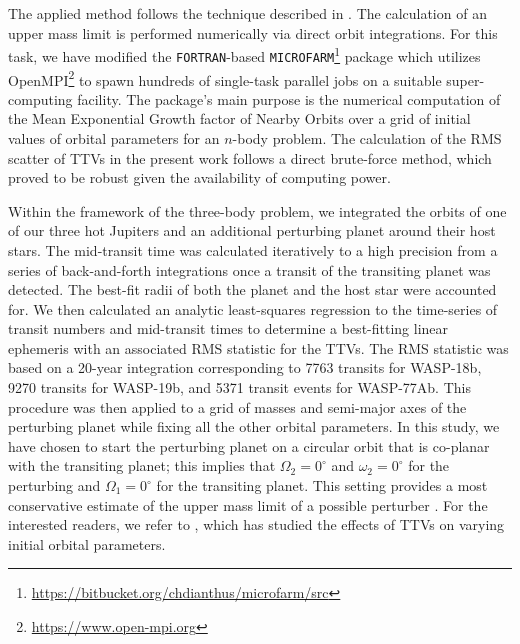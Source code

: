 The applied method follows the technique described in \citet{TEMP1,TEMP2,TEMP4}. The calculation of an upper mass limit is performed numerically via direct orbit integrations. For this task, we have modified the \texttt{FORTRAN}-based \texttt{MICROFARM}\footnote{\url{https://bitbucket.org/chdianthus/microfarm/src}}
package \citep{go2003,go2008} which utilizes OpenMPI\footnote{\url{https://www.open-mpi.org}} to spawn hundreds of single-task parallel jobs on a suitable super-computing facility. The package's main purpose is the numerical computation of the Mean Exponential Growth factor of Nearby Orbits
\citep[MEGNO]{cincsimo2000, go2001, ci2003} over a grid of initial values of orbital parameters for an $n$-body problem. The calculation of the RMS scatter of TTVs in the present work follows a direct brute-force method, which proved to be robust given the availability of computing power.

Within the framework of the three-body problem, we integrated the orbits of one of our three hot Jupiters and an additional perturbing planet around their host stars. The mid-transit time was calculated iteratively to a high precision from a series of back-and-forth integrations once a transit of the transiting planet was detected. The best-fit radii of both the planet and the host star were accounted for. We then calculated an analytic least-squares regression to the time-series of transit numbers and mid-transit times to determine a best-fitting linear ephemeris with an associated RMS statistic for the TTVs. The RMS statistic was based on a 20-year integration corresponding to 7763 transits for WASP-18b, 9270 transits for WASP-19b, and 5371 transit events for WASP-77Ab. This procedure was then applied to a grid of masses and semi-major axes of the perturbing planet while fixing all the other orbital parameters. In this study, we have chosen to start the perturbing planet on a circular orbit that is co-planar with the transiting planet; this implies that $\Omega_2=0^{\circ}$ and $\omega_2=0^{\circ}$ for the perturbing and $\Omega_1 = 0^{\circ}$ for the transiting planet. This setting provides a most conservative estimate of the upper mass limit of a possible perturber \citep{bean2009, fukui2011, Hoyer2011, Hoyer2012}. For the interested readers, we refer to \citet{TEMP4}, which has studied the effects of TTVs on varying initial orbital parameters.

